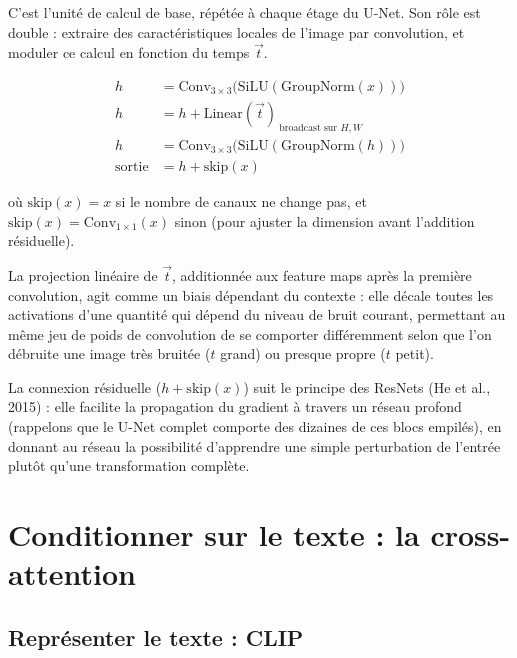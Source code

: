 C'est l'unité de calcul de base, répétée à chaque étage du U-Net. Son rôle est double : extraire des
caractéristiques locales de l'image par convolution, et moduler ce calcul en fonction du temps $\vec t$.

\begin{equation}
\begin{aligned}
    h &= \text{Conv}_{3\times3}\big(\text{SiLU}(\text{GroupNorm}(x))\big) \\
    h &= h + \text{Linear}(\vec t)_{\ \text{broadcast sur } H,W} \\
    h &= \text{Conv}_{3\times3}\big(\text{SiLU}(\text{GroupNorm}(h))\big) \\
    \text{sortie} &= h + \text{skip}(x)
\end{aligned}
\end{equation}

où $\text{skip}(x) = x$ si le nombre de canaux ne change pas, et $\text{skip}(x) = \text{Conv}_{1\times1}(x)$
sinon (pour ajuster la dimension avant l'addition résiduelle).

\begin{intuition}
La projection linéaire de $\vec t$, additionnée aux feature maps après la première convolution, agit
comme un \og biais dépendant du contexte \fg : elle décale toutes les activations d'une quantité qui
dépend du niveau de bruit courant, permettant au même jeu de poids de convolution de se comporter
différemment selon que l'on débruite une image très bruitée ($t$ grand) ou presque propre ($t$ petit).
\end{intuition}

La connexion résiduelle ($h + \text{skip}(x)$) suit le principe des ResNets (He et al., 2015) : elle
facilite la propagation du gradient à travers un réseau profond (rappelons que le U-Net complet
comporte des dizaines de ces blocs empilés), en donnant au réseau la possibilité d'apprendre une
simple perturbation de l'entrée plutôt qu'une transformation complète.

\section{Conditionner sur le texte : la cross-attention}
\label{sec:cross-attn}

\subsection{Représenter le texte : CLIP}
\label{sec:clip}


